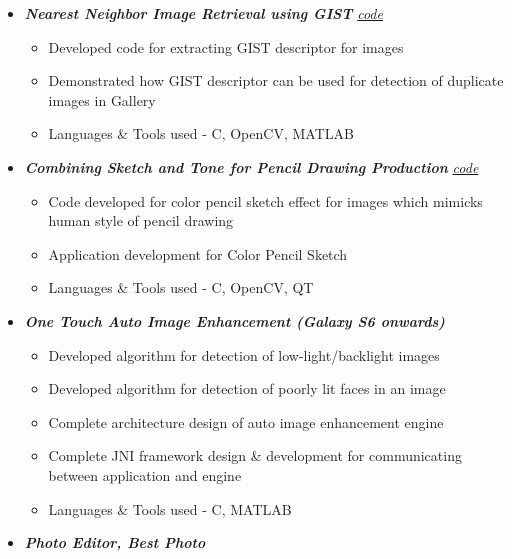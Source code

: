 \documentclass[letterpaper,11pt]{article}
\def\CC{{C\nolinebreak[4]\hspace{-.05em}\raisebox{.4ex}{\tiny\bf ++}}}
\newcommand{\resitem}[1]{\item #1 \vspace{-2pt}}
\begin{document}
\begin{itemize}
\begin{itemize}
\begin{itemize}
				\end{itemize}
				\vspace{2.5mm}
				\resitem[]{\faCircleO \hspace{1mm}\textbf{\emph{Nearest Neighbor Image Retrieval using GIST}}\hspace{1mm}
					\faGithub \hspace{1mm} \href{https://github.com/nrupatunga/GIST-global-Image-Descripor}{\emph{code}}}
				\begin{itemize}
						\resitem{Developed code for extracting GIST descriptor for images}
						\resitem{Demonstrated how GIST descriptor can be used for detection of duplicate images in Gallery}
						\resitem{Languages \& Tools used - \CC, OpenCV, MATLAB}
				\end{itemize}
				\vspace{2.5mm}
				\resitem[]{\faCircleO \hspace{1mm}\textbf{\emph{Combining Sketch and Tone for Pencil Drawing Production}}\hspace{1mm}
					\faGithub \hspace{1mm} \href{https://github.com/nrupatunga/Color-Pencil-Sketch}{\emph{code}}}
				\begin{itemize}
						\resitem{Code developed for color pencil sketch effect for images which mimicks human style of pencil drawing}
						\resitem{Application development for Color Pencil Sketch}
						\resitem{Languages \& Tools used - \CC, OpenCV, QT}
				\end{itemize}
				\vspace{15mm}
				\resitem[]{\faCircleO \hspace{1mm}\textbf{\emph{One Touch Auto Image Enhancement (Galaxy S6 onwards)}}}
				\begin{itemize}
						\resitem{Developed algorithm for detection of low-light/backlight images}
						\resitem{Developed algorithm for detection of poorly lit faces in an image}
						\resitem{Complete architecture design of auto image enhancement engine }
						\resitem{Complete JNI framework design \& development for communicating between application and engine}
						\resitem{Languages \& Tools used - C, MATLAB}
				\end{itemize}
				\vspace{2.5mm}
				\resitem[]{\faCircleO \hspace{1mm}\textbf{\emph{Photo Editor, Best Photo}}}
				\begin{itemize}

\end{itemize}
\end{itemize}
\end{itemize}
\end{document}
